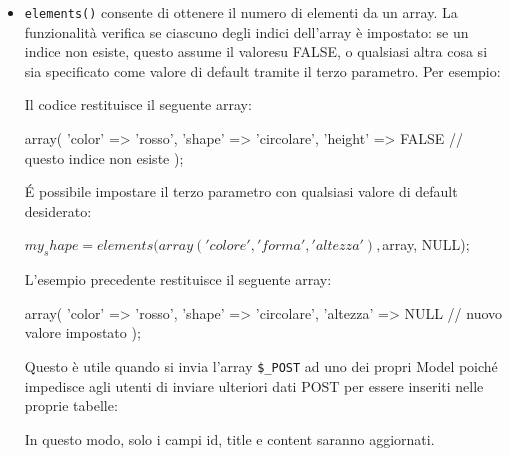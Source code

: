 \begin{itemize}
\item \verb|elements()| consente di ottenere il numero di elementi da un array. La funzionalità verifica se ciascuno degli indici dell'array è impostato: se un indice non esiste, questo assume il valoresu FALSE, o qualsiasi altra cosa si sia specificato come valore di default tramite il terzo parametro. Per esempio:


Il codice restituisce il seguente array:

\begin{code}
array(
    'color' => 'rosso',
    'shape' => 'circolare',
    'height' => FALSE // questo indice non esiste
);
\end{code}

\'E possibile impostare il terzo parametro con qualsiasi valore di default desiderato:

\begin{code}
$my_shape = elements(array('colore', 'forma', 'altezza'), $array, NULL);
\end{code}

L'esempio precedente restituisce il seguente array:

\begin{code}
array(
    'color' => 'rosso',
    'shape' => 'circolare',
    'altezza' => NULL // nuovo valore impostato
);
\end{code}

Questo è utile quando si invia l'array \verb|$_POST| ad uno dei propri Model poiché impedisce agli utenti di inviare ulteriori dati POST per essere inseriti nelle proprie tabelle:


In questo modo, solo i campi id, title e content saranno aggiornati.
\end{itemize}